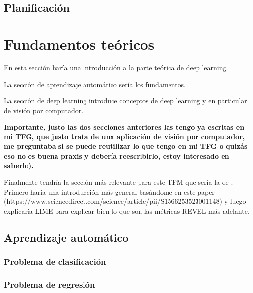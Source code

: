 \section{Planificación}



\clearpage
\chapter{Fundamentos teóricos} \label{cap:ft}

En esta sección haría una introducción a la parte teórica de deep learning.

La sección de aprendizaje automático sería los fundamentos.

La sección de deep learning introduce conceptos de deep learning y en particular de visión por computador.

\textbf{Importante, justo las dos secciones anteriores las tengo ya escritas en mi TFG, que justo trata de una aplicación de visión por computador, me preguntaba si se puede reutilizar lo que tengo en mi TFG o quizás eso no es buena praxis y debería reescribirlo, estoy interesado en saberlo).}

Finalmente tendría la sección más relevante para este TFM que sería la de . Primero haría una introducción más general basándome en este paper (https://www.sciencedirect.com/science/article/pii/S1566253523001148) y luego explicaría LIME para explicar bien lo que son las métricas REVEL más adelante. 
\section{Aprendizaje automático}


\subsection{Problema de clasificación}

\subsection{Problema de regresión}

